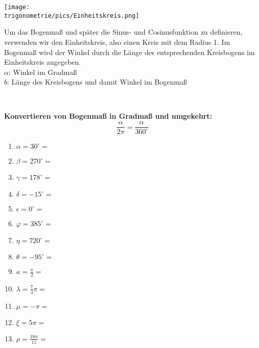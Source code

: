 \begin{minipage}{\textwidth}
	\begin{minipage}{.5\textwidth}
		\texttt{[image: \\trigonometrie/pics/Einheitskreis.png]}
	\end{minipage}
	\begin{minipage}{.5\textwidth}\raggedright
		Um das Bogenmaß und später die Sinus- und Cosinusfunktion zu definieren, verwenden wir den Einheitskreis, also einen Kreis mit dem Radius 1.
		Im Bogenmaß wird der Winkel durch die Länge des entsprechenden Kreisbogens im Einheitskreis angegeben.\\		
		\textcolor{loes}{\(\alpha\): Winkel im Gradmaß}\\
		\textcolor{loes}{\(b\): Länge des Kreisbogens und damit Winkel im Bogenmaß}
	\end{minipage}
\end{minipage}\\
\begin{tcolorbox}
	\textbf{Konvertieren von Bogenmaß in Gradmaß und umgekehrt:}
	\textcolor{loestc}{\[\frac{\alpha}{2\pi}=\frac{\alpha}{360^\circ}\]
	}
\end{tcolorbox}


\begin{Exercise}[title={\raggedright\normalfont Bestimme jeweils das Grad- bzw. Bogenmaß.}, label=bogenmassA1]
	\begin{enumerate}[label=\alph*)]
		\item \(\alpha=30^\circ=\)
		\item \(\beta=270^\circ=\)
		\item \(\gamma=178^\circ=\)
		\item \(\delta=-15^\circ=\)
		\item \(\epsilon=0^\circ=\)
		\item \(\varphi=385^\circ=\)
		\item \(\eta=720^\circ=\)
		\item \(\theta=-95^\circ=\)
		\item \(\kappa=\frac{\pi}{2}=\)
		\item \(\lambda=\frac{7}{3}\pi=\)
		\item \(\mu=-\pi=\)
		\item \(\xi=5\pi=\)
		\item \(\rho=\frac{18\pi}{11}=\)	
	\end{enumerate}
\end{Exercise}



